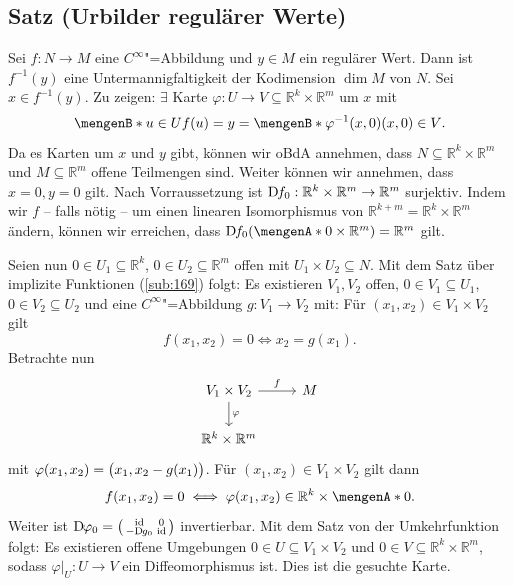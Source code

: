 \subsection{Satz (Urbilder regulärer Werte)} %
\label{sub:167}
Sei $f : N \to M$ eine $C^\infty$"=Abbildung und $y \in M$ ein regulärer Wert. Dann ist $f ^{-1}(y)$ eine Untermannigfaltigkeit der Kodimension $\dim M$ von $N$.
Sei $x \in f ^{-1}(y)$. Zu zeigen: $\exists$ Karte $\varphi : U \to V \subseteq \mathds{R}^k \times \mathds{R}^m$ um $x$ mit 
\[
	\set[u \in U]{f(u)=y} = \set[\varphi ^{-1} (x,0)]{(x,0) \in V}.
\]
Da es Karten um $x$ und $y$ gibt, können wir oBdA annehmen, dass $N \subseteq \mathds{R}^k \times \mathds{R}^m$ und $M \subseteq \mathds{R}^m$ offene Teilmengen sind.
Weiter können wir annehmen, dass $x=0, y=0$ gilt. Nach Vorraussetzung ist $\D f_0 : \mathds{R}^k \times \mathds{R}^m \to \mathds{R}^m$ surjektiv. Indem wir $f$ -- falls 
nötig -- um einen linearen Isomorphismus von $\mathds{R}^{k+m} = \mathds{R}^k \times \mathds{R}^m$ ändern, können wir erreichen, dass 
$\D f_0 \enbrace*{\set{0} \times \mathds{R}^m } = \mathds{R}^m$ gilt.

Seien nun $0\in U_1 \subseteq \mathds{R}^k$, $0 \in U_2 \subseteq \mathds{R}^m$ offen mit $U_1 \times U_2 \subseteq N$. Mit dem Satz über implizite Funktionen (\ref{sub:169})
folgt: Es existieren $V_1, V_2$ offen, $0 \in V_1 \subseteq U_1$, $0 \in V_2 \subseteq U_2$ und eine $C^\infty$"=Abbildung $g : V_1 \to V_2$  mit: Für 
$(x_1, x_2) \in V_1 \times V_2$ gilt
\[
	f(x_1, x_2) = 0 \iff x_2 = g(x_1).
\]
Betrachte nun
\[
	\begin{tikzcd}
		V_1 \times V_2 \rar["f"]  \dar["\varphi"]& M \\
		\mathds{R}^k \times \mathds{R}^m
	\end{tikzcd}
\]
mit $\varphi(x_1, x_2) = \enbrace[\big]{x_1, x_2 - g(x_1)}$. Für $(x_1, x_2) \in V_1 \times V_2$ gilt dann
\[
	f(x_1, x_2) = 0 \iff \varphi(x_1, x_2) \in \mathds{R}^k \times \set{0}.
\]
Weiter ist $\D \varphi_0 = \begin{psmallmatrix}
	\id & 0 \\
	-\D g_0 & \id
\end{psmallmatrix}$ invertierbar. Mit dem Satz von der Umkehrfunktion folgt: Es existieren offene Umgebungen $ 0 \in U \subseteq V_1 \times V_2$ und 
$0 \in V \subseteq \mathds{R}^k \times \mathds{R}^m$, sodass $\varphi \big|_{U} : U \to V$ ein Diffeomorphismus ist. Dies ist die gesuchte Karte. \bewende


